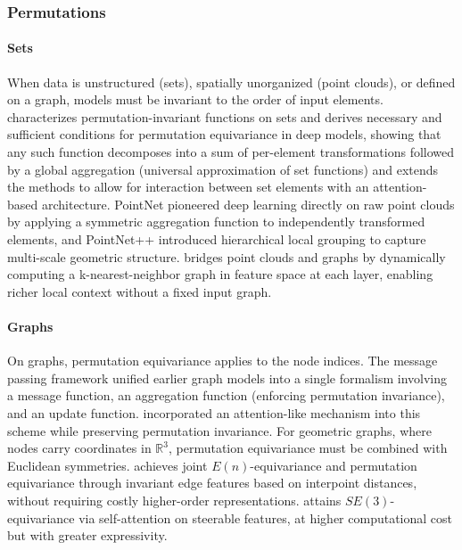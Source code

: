 \documentclass[mathematics,review,submit,moreauthors]{Definitions/mdpi}
\begin{document}
\subsubsection{Permutations}

\paragraph{Sets}
When data is unstructured (sets), spatially unorganized (point clouds), or defined on a graph, models must be invariant to the order of input elements.
\citet{zaheer2018} characterizes permutation-invariant functions on sets and derives necessary and sufficient conditions for permutation equivariance in deep models, showing that any such function decomposes into a sum of per-element transformations followed by a global aggregation (universal approximation of set functions) and \citet{lee2019p3icml} extends the methods to allow for interaction between set elements with an attention-based architecture.
PointNet \citep{qi2017a} pioneered deep learning directly on raw point clouds by applying a symmetric aggregation function to independently transformed elements, and PointNet++ \citep{qi2017} introduced hierarchical local grouping to capture multi-scale geometric structure.
\citet{wang2019} bridges point clouds and graphs by dynamically computing a k-nearest-neighbor graph in feature space at each layer, enabling richer local context without a fixed input graph.

\paragraph{Graphs}
On graphs, permutation equivariance applies to the node indices.
The message passing framework \citep{gilmer2017} unified earlier graph models \citep{duvenaud2015,kipf2017,bruna2014} into a single formalism involving a message function, an aggregation function (enforcing permutation invariance), and an update function.
\citet{velickovic2018} incorporated an attention-like mechanism into this scheme while preserving permutation invariance.
For geometric graphs, where nodes carry coordinates in $\mathbb{R}^3$, permutation equivariance must be combined with Euclidean symmetries.
\citet{satorras2021p3icml} achieves joint $E(n)$-equivariance and permutation equivariance through invariant edge features based on interpoint distances, without requiring costly higher-order representations.
\citet{fuchs2020} attains $SE(3)$-equivariance via self-attention on steerable features, at higher computational cost but with greater expressivity.
\end{document}
